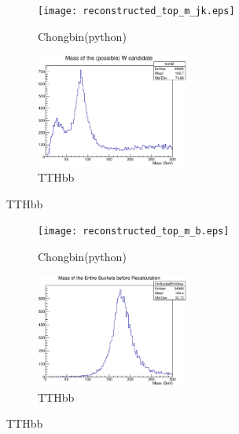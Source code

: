 \documentclass{beamer}
\begin{document}
\begin{frame}
  \begin{figure}[!h]
  \captionsetup[subfigure]{labelformat=empty}
  \begin{subfigure}{.5\textwidth}
  \centering
  \texttt{[image: reconstructed\_top\_m\_jk.eps]}
  \caption{Chongbin(python)}
  \end{subfigure} \hfill
  \begin{subfigure}{.5\textwidth}
  \centering
  \includegraphics[width=5cm]{hmW_alljetregion.eps}
  \caption{TTHbb}
  \end{subfigure}
  \end{figure}
\end{frame}

\begin{frame}
  \begin{figure}[!h]
  \captionsetup[subfigure]{labelformat=empty}
  \begin{subfigure}{.5\textwidth}
  \centering
  \texttt{[image: reconstructed\_top\_m\_b.eps]}
  \caption{Chongbin(python)}
  \end{subfigure} \hfill
  \begin{subfigure}{.5\textwidth}
  \centering
  \includegraphics[width=5cm]{hmBucketPrim_alljetregion.eps}
  \caption{TTHbb}
  \end{subfigure}
  \end{figure}
\end{frame}
\end{document}

